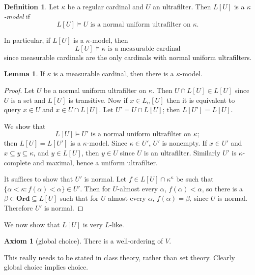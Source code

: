 \documentclass[12pt]{report}
\newcommand{\Ord}{\mathbf{Ord}}
\newcommand{\dfn}[1]{\emph{#1}\index{#1}}
\theoremstyle{definition}
\newtheorem{lemma}[theorem]{Lemma}
\newtheorem{axiom}[theorem]{Axiom}
\newtheorem{definition}[theorem]{Definition}
\begin{document}
\begin{definition}
Let $\kappa$ be a regular cardinal and $U$ an ultrafilter. Then $L[U]$ is a \dfn{$\kappa$-model} if
$$L[U] \models \text{$U$ is a normal uniform ultrafilter on $\kappa$}.$$
\end{definition}
In particular, if $L[U]$ is a $\kappa$-model, then
$$L[U] \models \text{$\kappa$ is a measurable cardinal}$$
since measurable cardinals are the only cardinals with normal uniform ultrafilters.

\begin{lemma}
If $\kappa$ is a measurable cardinal, then there is a $\kappa$-model.
\end{lemma}
\begin{proof}
Let $U$ be a normal uniform ultrafilter on $\kappa$. Then $U \cap L[U] \in L[U]$ since $U$ is a set and $L[U]$ is transitive. Now if $x \in L_\alpha[U]$ then it is equivalent to query $x \in U$ and $x \in U \cap L[U]$. Let $U' = U \cap L[U]$; then $L[U'] = L[U]$.

We show that
$$L[U] \models \text{$U'$ is a normal uniform ultrafilter on $\kappa$};$$
then $L[U] = L[U']$ is a $\kappa$-model.
Since $\kappa \in U'$, $U'$ is nonempty. If $x \in U'$ and $x \subseteq y \subseteq \kappa$, and $y \in L[U]$, then $y \in U$ since $U$ is an ultrafilter.
Similarly $U'$ is $\kappa$-complete and maximal, hence a uniform ultrafilter.

It suffices to show that $U'$ is normal. Let $f \in L[U] \cap \kappa^\kappa$ be such that $\{\alpha < \kappa: f(\alpha) < \alpha\} \in U'$.
Then for $U$-almost every $\alpha$, $f(\alpha) < \alpha$, so there is a $\beta \in \Ord \subseteq L[U]$ such that for $U$-almost every $\alpha$, $f(\alpha) = \beta$, since $U$ is normal.
Therefore $U'$ is normal.
\end{proof}

We now show that $L[U]$ is very $L$-like.
\begin{axiom}[global choice]
There is a well-ordering of $V$.
\end{axiom}
This really needs to be stated in class theory, rather than set theory.
Clearly global choice implies choice.
\end{document}
